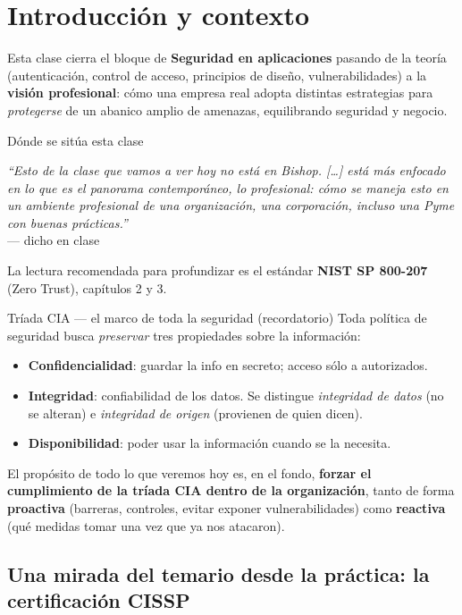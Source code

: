\documentclass[11pt,a4paper]{article}
\newcommand{\prof}[1]{\par\medskip\noindent\textit{``#1''}\\[-2pt]\hspace*{1em}%
  {\footnotesize\textcolor{black!60}{--- dicho en clase}}\par\medskip\noindent}
\begin{document}
\tableofcontents
\newpage

\section{Introducción y contexto}

Esta clase cierra el bloque de \textbf{Seguridad en aplicaciones} pasando de la teoría
(autenticación, control de acceso, principios de diseño, vulnerabilidades) a la
\textbf{visión profesional}: cómo una empresa real adopta distintas estrategias para
\emph{protegerse} de un abanico amplio de amenazas, equilibrando seguridad y negocio.

\begin{anecbox}{Dónde se sitúa esta clase}
\prof{Esto de la clase que vamos a ver hoy no está en Bishop. [\dots] está más enfocado en
lo que es el panorama contemporáneo, lo profesional: cómo se maneja esto en un ambiente
profesional de una organización, una corporación, incluso una Pyme con buenas prácticas.}
La lectura recomendada para profundizar es el estándar \textbf{NIST SP 800-207} (Zero Trust),
capítulos 2 y 3.
\end{anecbox}

\begin{defbox}{Tríada CIA — el marco de toda la seguridad (recordatorio)}
Toda política de seguridad busca \emph{preservar} tres propiedades sobre la información:
\begin{itemize}[leftmargin=1.4em,itemsep=2pt]
  \item \textbf{Confidencialidad}: guardar la info en secreto; acceso sólo a autorizados.
  \item \textbf{Integridad}: confiabilidad de los datos. Se distingue \emph{integridad de
        datos} (no se alteran) e \emph{integridad de origen} (provienen de quien dicen).
  \item \textbf{Disponibilidad}: poder usar la información cuando se la necesita.
\end{itemize}
El propósito de todo lo que veremos hoy es, en el fondo, \textbf{forzar el cumplimiento de la
tríada CIA dentro de la organización}, tanto de forma \textbf{proactiva} (barreras, controles,
evitar exponer vulnerabilidades) como \textbf{reactiva} (qué medidas tomar una vez que ya nos
atacaron).
\end{defbox}

\subsection{Una mirada del temario desde la práctica: la certificación CISSP}
\end{document}
